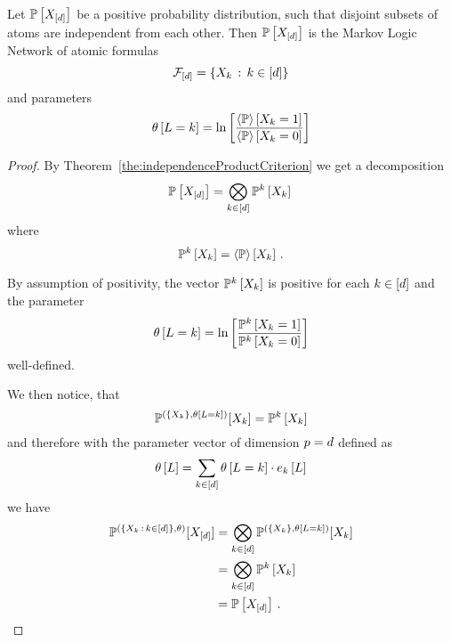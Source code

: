 \begin{theorem}\label{the:independentAtomicMLN}
	Let $\mathbb{P}\left[X_{[d]}\right]$ be a positive probability distribution, such that disjoint subsets of atoms are independent from each other.
	Then $\mathbb{P}\left[X_{[d]}\right]$ is the Markov Logic Network of atomic formulas
		\[ \mathcal{F}_{[d]} = \{X_{k} \, : \, k\in[d] \} \]
	and parameters
		\[ \theta\left[L=k\right] 
		= \ln \left[ \frac{
		\left\langle \mathbb{P}\right\rangle \left[ X_{k}=1 \right]
		}{
		\left\langle \mathbb{P}\right\rangle \left[ X_{k}=0 \right]
		} \right] \]
\end{theorem}
\begin{proof}
	
	By Theorem~\ref{the:independenceProductCriterion} we get a decomposition 
		\[ \mathbb{P}\left[X_{[d]}\right] = \bigotimes_{k\in[d]} \mathbb{P}^{k}\left[X_{k}\right] \,  \]
	where 
		\[ \mathbb{P}^{k}\left[X_{k}\right] = \left\langle \mathbb{P}\right\rangle \left[ X_{k} \right] \, . \]
	
	By assumption of positivity, the vector $\mathbb{P}^{k}\left[X_{k}\right]$ is positive for each $k\in[d]$ and the parameter
		\[ \theta\left[L=k\right] 
		= \ln \left[ \frac{
		\mathbb{P}^{k}\left[X_{k}=1\right]
		}{
		\mathbb{P}^{k}\left[X_{k}=0\right]
		} \right] \]
	well-defined.
	
	We then notice, that 
		\[ \mathbb{P}^{(\{X_{k}\},\theta\left[L=k\right])}[X_{k}] 
		= \mathbb{P}^{k}\left[X_{k}\right]\]
	and therefore with the parameter vector of dimension $p=d$ defined as
		\[ \theta\left[L\right] = \sum_{k\in[d]} \theta\left[L=k\right] \cdot e_{k}\left[L\right]  \]
	we have
	\begin{align*}
	 	 \mathbb{P}^{(\{X_{k} \, : \, k\in[d]\},\theta)}[X_{[d]}] 
		& = \bigotimes_{k\in[d]} \mathbb{P}^{(\{X_{k}\},\theta\left[L=k\right])}[X_{k}] \\
		& = \bigotimes_{k\in[d]} \mathbb{P}^{k}\left[X_{k}\right] \\
		& = \mathbb{P}\left[X_{[d]}\right] \, . 
	\end{align*}
\end{proof}

